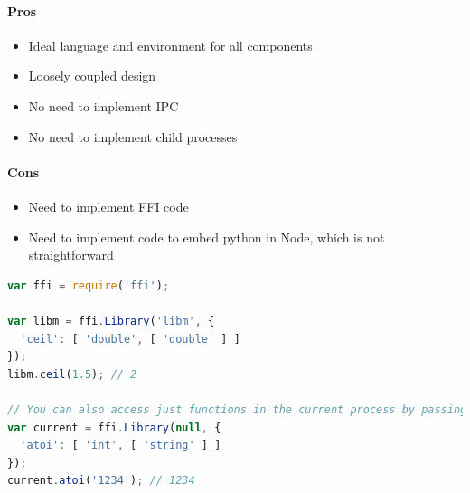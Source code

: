 \paragraph{Pros}

\begin{itemize}
  \item Ideal language and environment for all components
  \item Loosely coupled design
  \item No need to implement IPC
  \item No need to implement child processes
\end{itemize}

\paragraph{Cons}

\begin{itemize}
  \item Need to implement FFI code
  \item Need to implement code to embed python in Node, which is not straightforward
\end{itemize}

\begin{minipage}{\linewidth}

  \begin{lstlisting}[language=JavaScript, label={lst:node_ffi}, caption=Example of using \url{node-ffi} to call a C library \autocite{node-ffi}., breaklines=true]
var ffi = require('ffi');

var libm = ffi.Library('libm', {
  'ceil': [ 'double', [ 'double' ] ]
});
libm.ceil(1.5); // 2

// You can also access just functions in the current process by passing a null
var current = ffi.Library(null, {
  'atoi': [ 'int', [ 'string' ] ]
});
current.atoi('1234'); // 1234
\end{lstlisting}

\end{minipage}

